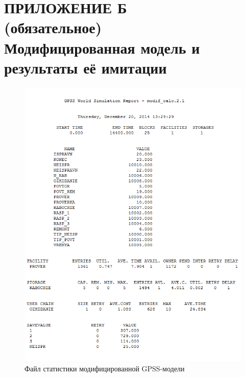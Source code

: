 \section*{ПРИЛОЖЕНИЕ Б \\ (обязательное) \\
  Модифицированная модель и результаты её имитации}

\pagestyle{fancy}
\fancyhf{}  %
\fancyfoot[R]{\thepage}
\renewcommand{\headrulewidth}{0pt}
\renewcommand{\footrulewidth}{0pt}

\setlength{\headheight}{10mm}
\setlength{\headsep}{\baselineskip}

\thispagestyle{plain}

\setcounter{section}{2}
\setcounter{figure}{0}
\setcounter{table}{0}
\setcounter{lstlisting}{0}



\begin{figure}[h!]
  \centering
  \includegraphics[width=150mm]{pic/modif_report}
  \caption{Файл статистики модифицированной GPSS-модели}
  \label{pic:modified_report}
\end{figure}
